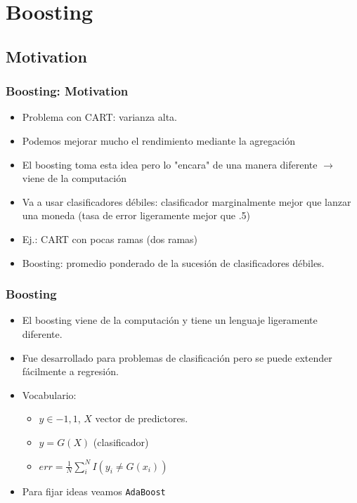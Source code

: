\documentclass[
  shownotes,
  xcolor={svgnames},
  hyperref={colorlinks,citecolor=DarkBlue,linkcolor=DarkRed,urlcolor=DarkBlue}
  , aspectratio=169]{beamer}
\begin{document}
\section{Boosting}
\subsection{Motivation}
\begin{frame}[fragile]
\frametitle{Boosting: Motivation}

\begin{itemize}
  \item Problema con CART: varianza alta.
  \medskip
   \item Podemos mejorar mucho el rendimiento mediante la agregación 
   \medskip 
   \item El boosting toma esta idea pero lo "encara" de una manera diferente $\rightarrow$ viene de la computación
   \medskip
   \item Va a usar clasificadores débiles: clasificador marginalmente mejor que lanzar una moneda (tasa de error ligeramente mejor que .5) 
\medskip
\item Ej.: CART con pocas ramas (dos ramas) 
\medskip
\item Boosting: promedio ponderado de la sucesión de clasificadores débiles.

\end{itemize}
\end{frame}
\begin{frame}[fragile]
\frametitle{Boosting}

\begin{itemize}
  \item El boosting viene de la computación y tiene un lenguaje ligeramente diferente.
  \medskip
  \item Fue desarrollado para problemas de clasificación pero se puede extender fácilmente a regresión.
\medskip
\item Vocabulario:
\medskip
  \begin{itemize}
  \item $y \in {-1,1}$, $X$ vector de predictores.
  \medskip
  \item $y = G (X)$ (clasificador)
  \medskip
  \item $err = \frac{1}{N} \sum_{i}^N I(y_i\neq G(x_i))$
  \end{itemize}
  \medskip
  \item Para fijar ideas veamos \texttt{AdaBoost}
\end{itemize}


\end{frame}
\end{document}

